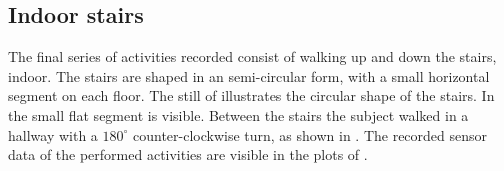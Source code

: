 \subsection{Indoor stairs}\label{subsec:indoor_stairs}
The final series of activities recorded consist of walking up and down the stairs, indoor.
The stairs are shaped in an semi-circular form, with a small horizontal segment on each floor.
The still of  illustrates the circular shape of the stairs.
In  the small flat segment is visible.
Between the stairs the subject walked in a hallway with a $180^{\circ}$ counter-clockwise turn, as shown in .
The recorded sensor data of the performed activities are visible in the plots of .

